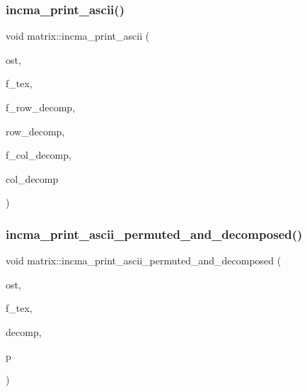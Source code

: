 \subsubsection{\texorpdfstring{incma\+\_\+print\+\_\+ascii()}{incma\_print\_ascii()}}
{\footnotesize\ttfamily void matrix\+::incma\+\_\+print\+\_\+ascii (\begin{DoxyParamCaption}\item[{ostream \&}]{ost,  }\item[{\mbox{\hyperlink{galois_8h_a09fddde158a3a20bd2dcadb609de11dc}{I\+NT}}}]{f\+\_\+tex,  }\item[{\mbox{\hyperlink{galois_8h_a09fddde158a3a20bd2dcadb609de11dc}{I\+NT}}}]{f\+\_\+row\+\_\+decomp,  }\item[{\mbox{\hyperlink{class_vector}{Vector}} \&}]{row\+\_\+decomp,  }\item[{\mbox{\hyperlink{galois_8h_a09fddde158a3a20bd2dcadb609de11dc}{I\+NT}}}]{f\+\_\+col\+\_\+decomp,  }\item[{\mbox{\hyperlink{class_vector}{Vector}} \&}]{col\+\_\+decomp }\end{DoxyParamCaption})}

\mbox{\label{classmatrix_a0ced6791191355bde858790aa4b156ac}} 
\subsubsection{\texorpdfstring{incma\+\_\+print\+\_\+ascii\+\_\+permuted\+\_\+and\+\_\+decomposed()}{incma\_print\_ascii\_permuted\_and\_decomposed()}}
{\footnotesize\ttfamily void matrix\+::incma\+\_\+print\+\_\+ascii\+\_\+permuted\+\_\+and\+\_\+decomposed (\begin{DoxyParamCaption}\item[{ostream \&}]{ost,  }\item[{\mbox{\hyperlink{galois_8h_a09fddde158a3a20bd2dcadb609de11dc}{I\+NT}}}]{f\+\_\+tex,  }\item[{\mbox{\hyperlink{class_vector}{Vector}} \&}]{decomp,  }\item[{\mbox{\hyperlink{classpermutation}{permutation}} \&}]{p }\end{DoxyParamCaption})}

